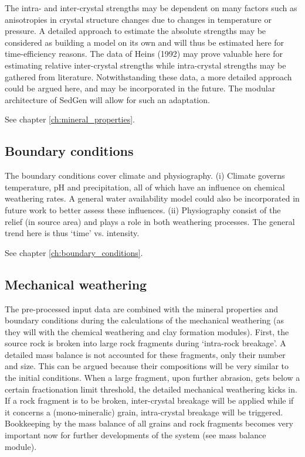     The intra- and inter-crystal strengths may be dependent on many factors such as anisotropies in crystal structure changes due to changes in temperature or pressure. %
    A detailed approach to estimate the absolute strengths may be considered as building a model on its own and will thus be estimated here for time-efficiency reasons. %
    The data of Heins (1992) may prove valuable here for estimating relative inter-crystal strengths while intra-crystal strengths may be gathered from literature. %
    Notwithstanding these data, a more detailed approach could be argued here, and may be incorporated in the future. %
    The modular architecture of SedGen will allow for such an adaptation. %

    See chapter \ref{ch:mineral_properties}. %

    \subsection{Boundary conditions}
    The boundary conditions cover climate and physiography. %
    (i) Climate governs temperature, pH and precipitation, all of which have an influence on chemical weathering rates. %
    A general water availability model could also be incorporated in future work to better assess these influences. %
    (ii) Physiography consist of the relief (in source area) and plays a role in both weathering processes. %
    The general trend here is thus ‘time’ vs. intensity.%

    See chapter \ref{ch:boundary_conditions}. %

    \subsection{Mechanical weathering}
    The pre-processed input data are combined with the mineral properties and boundary conditions during the calculations of the mechanical weathering (as they will with the chemical weathering and clay formation modules). %
    First, the source rock is broken into large rock fragments during ‘intra-rock breakage’. %
    A detailed mass balance is not accounted for these fragments, only their number and size. %
    This can be argued because their compositions will be very similar to the initial conditions. %
    When a large fragment, upon further abrasion, gets below a certain fractionation limit threshold, the detailed mechanical weathering kicks in. %
    If a rock fragment is to be broken, inter-crystal breakage will be applied while if it concerns a (mono-mineralic) grain, intra-crystal breakage will be triggered. %
    Bookkeeping by the mass balance of all grains and rock fragments becomes very important now for further developments of the system (see mass balance module). %

